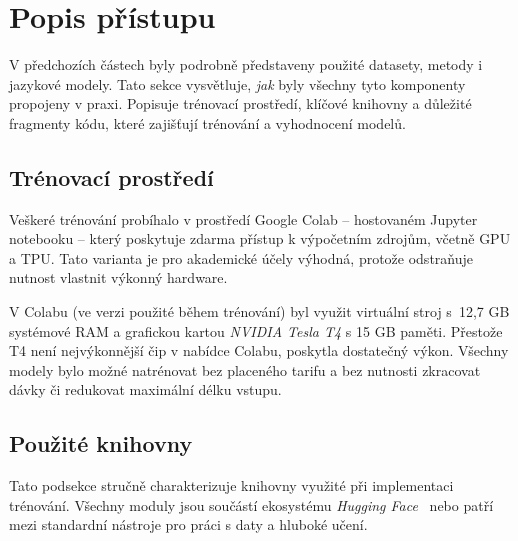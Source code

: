 \section{Popis přístupu}
V předchozích částech byly podrobně představeny použité datasety, metody i jazykové modely. Tato sekce vysvětluje, \emph{jak} byly všechny tyto komponenty propojeny v praxi. Popisuje trénovací prostředí, klíčové knihovny a důležité fragmenty kódu, které zajišťují trénování a vyhodnocení modelů.

\subsection{Trénovací prostředí}
Veškeré trénování probíhalo v prostředí Google Colab \cite{GoogleColab} -- hostovaném Jupyter notebooku -- který poskytuje zdarma přístup k výpočetním zdrojům, včetně GPU a TPU. Tato varianta je pro akademické účely výhodná, protože odstraňuje nutnost vlastnit výkonný hardware.

V Colabu (ve verzi použité během trénování) byl využit virtuální stroj s~12{,}7 GB systémové RAM a grafickou kartou \emph{NVIDIA Tesla T4} \cite{T4Nvidia} s 15 GB paměti. Přestože T4 není nejvýkonnější čip v nabídce Colabu, poskytla dostatečný výkon. Všechny modely bylo možné natrénovat bez placeného tarifu a bez nutnosti zkracovat dávky či redukovat maximální délku vstupu.

\subsection{Použité knihovny}
Tato podsekce stručně charakterizuje knihovny využité při implementaci trénování. Všechny moduly jsou součástí ekosystému \emph{Hugging Face}~\cite{huggingface} nebo patří mezi standardní nástroje pro práci s daty a hluboké učení.

